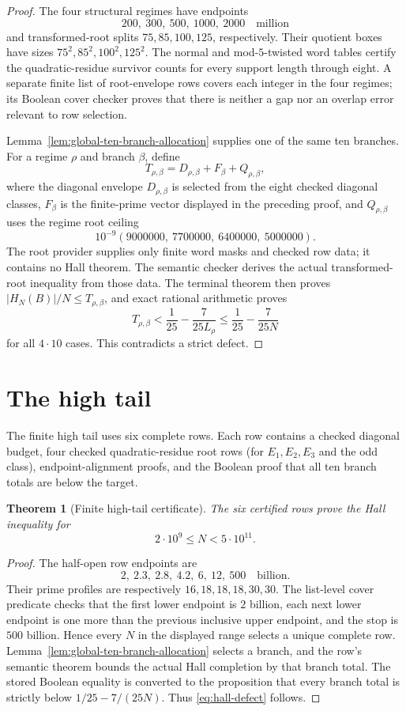 \documentclass[11pt]{article}
\newtheorem{theorem}{Theorem}[section]
\theoremstyle{definition}
\newcommand{\TwoBillion}{2\cdot10^9}
\newcommand{\FiveHundredBillion}{5\cdot10^{11}}
\begin{document}
\begin{proof}
The four structural regimes have endpoints
\[
 200,\ 300,\ 500,\ 1000,\ 2000
\quad\text{million}
\]
and transformed-root splits $75,85,100,125$, respectively.  Their quotient
boxes have sizes $75^2,85^2,100^2,125^2$.  The normal and mod-$5$-twisted
word tables certify the quadratic-residue survivor counts for every support
length through eight.  A separate finite list of root-envelope rows covers
each integer in the four regimes; its Boolean cover checker proves that
there is neither a gap nor an overlap error relevant to row selection.

Lemma~\ref{lem:global-ten-branch-allocation} supplies one of the same ten
branches.  For a regime $\rho$ and branch $\beta$, define
\[
 T_{\rho,\beta}
 =D_{\rho,\beta}+F_\beta+Q_{\rho,\beta},
\]
where the diagonal envelope $D_{\rho,\beta}$ is selected from the eight
checked diagonal classes, $F_\beta$ is the finite-prime vector displayed in
the preceding proof, and $Q_{\rho,\beta}$ uses the regime root ceiling
\[
 10^{-9}(9000000,\ 7700000,\ 6400000,\ 5000000).
\]
The root provider supplies only finite word masks and checked row data; it
contains no Hall theorem.  The semantic checker derives the actual
transformed-root inequality from those data.  The terminal theorem then
proves $|H_N(B)|/N\leq T_{\rho,\beta}$, and exact rational arithmetic proves
\[
 T_{\rho,\beta}
 <\frac1{25}-\frac7{25L_\rho}
 \leq\frac1{25}-\frac7{25N}
\]
for all $4\cdot10$ cases.  This contradicts a strict defect.
\end{proof}

\section{The high tail}

The finite high tail uses six complete rows.  Each row contains a checked
diagonal budget, four checked quadratic-residue root rows (for
$E_1,E_2,E_3$ and the odd class), endpoint-alignment proofs, and the Boolean
proof that all ten branch totals are below the target.

\begin{theorem}[Finite high-tail certificate]\label{thm:finite-high-tail}
The six certified rows prove the Hall inequality for
\[
 \TwoBillion\leq N<\FiveHundredBillion.
\]
\end{theorem}

\begin{proof}
The half-open row endpoints are
\[
 2,\ 2.3,\ 2.8,\ 4.2,\ 6,\ 12,\ 500
\quad\text{billion}.
\]
Their prime profiles are respectively $16,18,18,18,30,30$.  The list-level
cover predicate checks that the first lower endpoint is $2$ billion, each
next lower endpoint is one more than the previous inclusive upper endpoint,
and the stop is $500$ billion.  Hence every $N$ in the displayed range
selects a unique complete row.  Lemma~\ref{lem:global-ten-branch-allocation}
selects a branch, and the row's semantic theorem bounds the actual Hall
completion by that branch total.  The stored Boolean equality is converted
to the proposition that every branch total is strictly below
$1/25-7/(25N)$.  Thus \eqref{eq:hall-defect} follows.
\end{proof}
\end{document}
